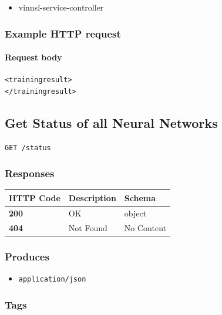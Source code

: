 \begin{itemize}
\tightlist
\item
  vinnsl-service-controller
\end{itemize}

\subsubsection{Example HTTP request}\label{example-http-request-4}

\paragraph{Request body}\label{request-body-3}

\begin{verbatim}
<trainingresult>
</trainingresult>
\end{verbatim}

\subsection{Get Status of all Neural
Networks}\label{get-status-of-all-neural-networks}

\begin{verbatim}
GET /status
\end{verbatim}

\subsubsection{Responses}\label{responses-10}

\begin{longtable}[]{@{}lll@{}}
\toprule
HTTP Code & Description & Schema\tabularnewline
\midrule
\endhead
\textbf{200} & OK & object\tabularnewline
\textbf{404} & Not Found & No Content\tabularnewline
\bottomrule
\end{longtable}

\subsubsection{Produces}\label{produces-10}

\begin{itemize}
\tightlist
\item
  \texttt{application/json}
\end{itemize}

\subsubsection{Tags}\label{tags-10}

